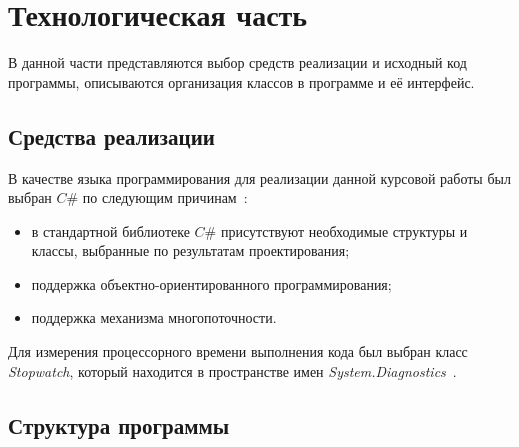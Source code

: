\chapter{Технологическая часть}

В данной части представляются выбор средств реализации и исходный код программы, описываются организация классов в программе и её интерфейс.

\section{Средства реализации}

В качестве языка программирования для реализации данной курсовой работы был выбран $C\#$ по следующим причинам~\cite{lit9}:
\begin{itemize}[label=--]
	\item в стандартной библиотеке $C\#$ присутствуют необходимые структуры и классы, выбранные по результатам проектирования;
	\item поддержка объектно-ориентированного программирования;
	\item поддержка механизма многопоточности.
\end{itemize}

Для измерения процессорного времени выполнения кода был выбран класс \textit{Stopwatch}, который находится в пространстве имен \textit{System.Diagnostics}~\cite{lit10}.

\section{Структура программы}

